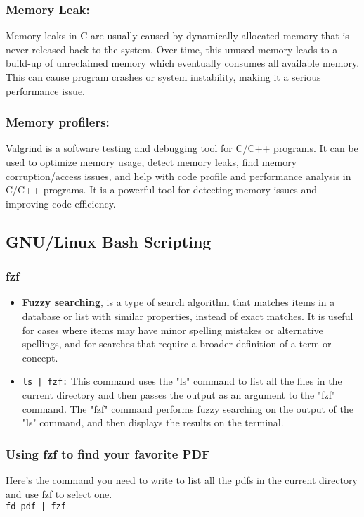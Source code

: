 \documentclass[12pt]{article}
\begin{document}
    \subsubsection{Memory Leak:}
        Memory leaks in C are usually caused by dynamically allocated memory that is never released back to the system. Over time, this unused memory leads to a build-up of unreclaimed memory which eventually consumes all available memory. This can cause program crashes or system instability, making it a serious performance issue.
    \subsubsection{Memory profilers:}
        Valgrind is a software testing and debugging tool for C/C++ programs. It can be used to optimize memory usage, detect memory leaks, find memory corruption/access issues, and help with code profile and performance analysis in C/C++ programs. It is a powerful tool for detecting memory issues and improving code efficiency.

\subsection{GNU/Linux Bash Scripting}
\subsubsection{fzf}
    \begin{itemize}
        \item \textbf{Fuzzy searching}, is a type of search algorithm that matches items in a database or list with similar properties, instead of exact matches. It is useful for cases where items may have minor spelling mistakes or alternative spellings, and for searches that require a broader definition of a term or concept. 
        \item \texttt{ls | fzf:} This command uses the "ls" command to list all the files in the current directory and then passes the output as an argument to the "fzf" command. The "fzf" command performs fuzzy searching on the output of the "ls" command, and then displays the results on the terminal.
    \end{itemize}
\subsubsection{Using fzf to find your favorite PDF}
Here's the command you need to write to list all the pdfs in the current directory and use fzf to select one.\\
\Large \texttt{fd pdf | fzf}
\end{document}
